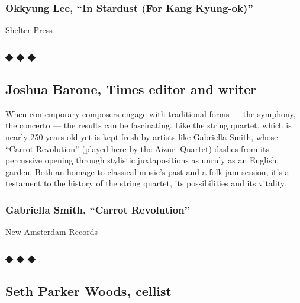 \hypertarget{okkyung-lee-in-stardust-for-kang-kyung-ok}{%
\subsubsection{Okkyung Lee, ``In Stardust (For Kang
Kyung-ok)''}\label{okkyung-lee-in-stardust-for-kang-kyung-ok}}

Shelter Press

\hypertarget{---10}{%
\subsubsection{◆ ◆ ◆}\label{---10}}

\hypertarget{joshua-barone-times-editor-and-writer}{%
\subsection{Joshua Barone, Times editor and
writer}\label{joshua-barone-times-editor-and-writer}}

When contemporary composers engage with traditional forms --- the
symphony, the concerto --- the results can be fascinating. Like the
string quartet, which is nearly 250 years old yet is kept fresh by
artists like Gabriella Smith, whose ``Carrot Revolution'' (played here
by the Aizuri Quartet) dashes from its percussive opening through
stylistic juxtapositions as unruly as an English garden. Both an homage
to classical music's past and a folk jam session, it's a testament to
the history of the string quartet, its possibilities and its vitality.

\hypertarget{gabriella-smith-carrot-revolution}{%
\subsubsection{Gabriella Smith, ``Carrot
Revolution''}\label{gabriella-smith-carrot-revolution}}

New Amsterdam Records

\hypertarget{---11}{%
\subsubsection{◆ ◆ ◆}\label{---11}}

\hypertarget{seth-parker-woods-cellist}{%
\subsection{Seth Parker Woods,
cellist}\label{seth-parker-woods-cellist}}

